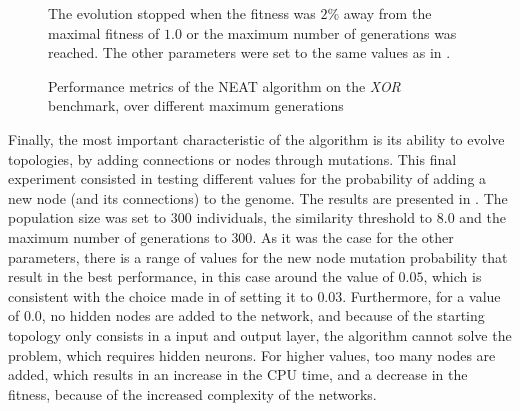 \begin{figure}
\begin{center}
    \end{center}
    \caption{Performance metrics of the NEAT algorithm on the \textit{XOR} benchmark, over different maximum generations}
    {The evolution stopped when the fitness was $2\%$ away from the maximal fitness of $1.0$ or the maximum number of generations was reached.
    The other parameters were set to the same values as in \cite{neat}.}
    \label{fig:neat_xor_generations}
\end{figure}

Finally, the most important characteristic of the algorithm is its ability to evolve topologies, by adding connections or nodes through mutations. This final experiment consisted in testing different
values for the probability of adding a new node (and its connections) to the genome. The results are presented in . The population size was set to $300$ individuals,
the similarity threshold to $8.0$ and the maximum number of generations to $300$. As it was the case for the other parameters, there is a range of values for the new node mutation probability that
result in the best performance, in this case around the value of $0.05$, which is consistent with the choice made in \cite{neat} of setting it to $0.03$. Furthermore, for a value of $0.0$, no hidden nodes are added
to the network, and because of the starting topology only consists in a input and output layer, the algorithm cannot solve the problem, which requires hidden neurons. For higher values,
too many nodes are added, which results in an increase in the CPU time, and a decrease in the fitness, because of the increased complexity of the networks.



